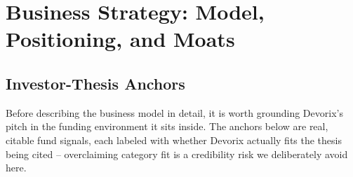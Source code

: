 \chapter{Business Strategy: Model, Positioning, and Moats}
\label{chap:business-strategy}

\section{Investor-Thesis Anchors}
\label{sec:thesis-anchors}

Before describing the business model in detail, it is worth grounding Devorix's pitch in the funding environment it sits inside. The anchors below are real, citable fund signals, each labeled with whether Devorix actually fits the thesis being cited -- overclaiming category fit is a credibility risk we deliberately avoid here.

